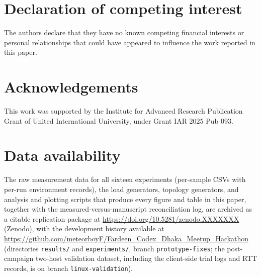 \documentclass[preprint,12pt]{elsarticle}
\begin{document}
\section*{Declaration of competing interest}
The authors declare that they have no known competing financial interests
or personal relationships that could have appeared to influence the work
reported in this paper.

\section*{Acknowledgements}
This work was supported by the Institute for Advanced Research Publication
Grant of United International University, under Grant IAR 2025 Pub 093.

\section*{Data availability}
The raw measurement data for all sixteen experiments (per-sample CSVs
with per-run environment records), the load generators, topology
generators, and analysis and plotting scripts that produce every figure
and table in this paper, together with the measured-versus-manuscript
reconciliation log, are archived as a citable replication package at
\url{https://doi.org/10.5281/zenodo.XXXXXXX} (Zenodo), with the
development history available at
\url{https://github.com/meteorboyF/Fardeen_Codex_Dhaka_Meetup_Hackathon}
(directories \texttt{results/} and \texttt{experiments/}, branch
\texttt{prototype-fixes}; the post-campaign two-host validation dataset,
including the client-side trial logs and RTT records, is on branch
\texttt{linux-validation}).
\end{document}
